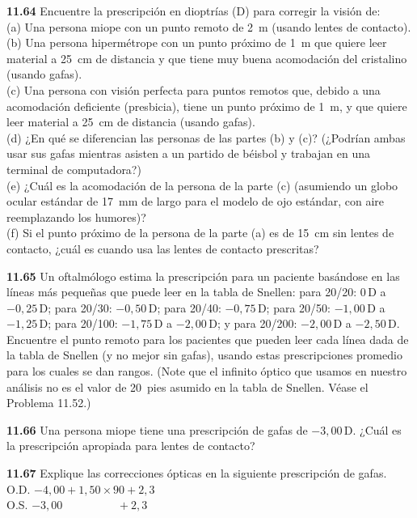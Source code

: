 \documentclass[12pt]{book}
\begin{document}
\textbf{11.64} Encuentre la prescripción en dioptrías (D) para corregir la visión de:\\
(a) Una persona miope con un punto remoto de 2~m (usando lentes de contacto).\\
(b) Una persona hipermétrope con un punto próximo de 1~m que quiere leer material a 25~cm de distancia y que tiene muy buena acomodación del cristalino (usando gafas).\\
(c) Una persona con visión perfecta para puntos remotos que, debido a una acomodación deficiente (presbicia), tiene un punto próximo de 1~m, y que quiere leer material a 25~cm de distancia (usando gafas).\\
(d) ¿En qué se diferencian las personas de las partes (b) y (c)? (¿Podrían ambas usar sus gafas mientras asisten a un partido de béisbol y trabajan en una terminal de computadora?)\\
(e) ¿Cuál es la acomodación de la persona de la parte (c) (asumiendo un globo ocular estándar de 17~mm de largo para el modelo de ojo estándar, con aire reemplazando los humores)?\\
(f) Si el punto próximo de la persona de la parte (a) es de 15~cm sin lentes de contacto, ¿cuál es cuando usa las lentes de contacto prescritas?

\textbf{11.65} Un oftalmólogo estima la prescripción para un paciente basándose en las líneas más pequeñas que puede leer en la tabla de Snellen: para 20/20: $0\,\text{D}$ a $-0{,}25\,\text{D}$; para 20/30: $-0{,}50\,\text{D}$; para 20/40: $-0{,}75\,\text{D}$; para 20/50: $-1{,}00\,\text{D}$ a $-1{,}25\,\text{D}$; para 20/100: $-1{,}75\,\text{D}$ a $-2{,}00\,\text{D}$; y para 20/200: $-2{,}00\,\text{D}$ a $-2{,}50\,\text{D}$. Encuentre el punto remoto para los pacientes que pueden leer cada línea dada de la tabla de Snellen (y no mejor sin gafas), usando estas prescripciones promedio para los cuales se dan rangos. (Note que el infinito óptico que usamos en nuestro análisis no es el valor de 20~pies asumido en la tabla de Snellen. Véase el Problema 11.52.)

\textbf{11.66} Una persona miope tiene una prescripción de gafas de $-3{,}00\,\text{D}$. ¿Cuál es la prescripción apropiada para lentes de contacto?

\textbf{11.67} Explique las correcciones ópticas en la siguiente prescripción de gafas.\\
O.D. $-4{,}00 + 1{,}50 \times 90 + 2{,}3$\\
O.S. $-3{,}00\phantom{+1{,}50 \times 90}+2{,}3$
\end{document}
